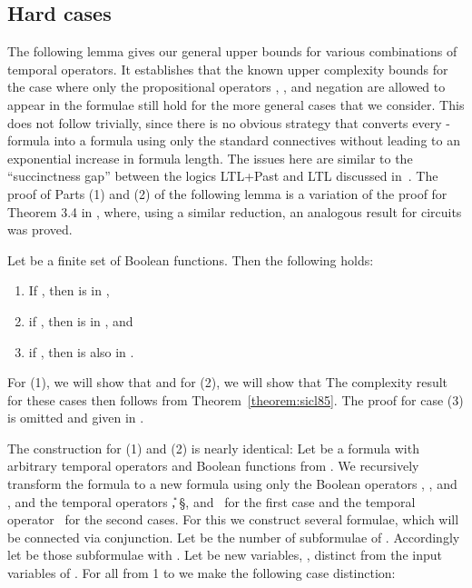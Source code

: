 \subsection{Hard cases}

  The following lemma gives our general upper bounds for various combinations of temporal operators.
It establishes that the known upper complexity bounds for the case
  where only the propositional operators \AND, \OR, and negation are
  allowed to appear in the formulae still hold for the more general
  cases that we consider. This does not follow trivially, since there
  is no obvious strategy that converts every -formula into a
  formula using only the standard connectives without leading to an
  exponential increase in formula length. The issues here are similar
  to the ``succinctness gap'' between the logics LTL+Past and LTL
  discussed in~\cite{mar04}. The proof of Parts (1) and (2) of the
  following lemma is a variation of the proof for Theorem 3.4 in
  \cite{bhss06}, where, using a similar reduction, an analogous result
  for circuits was proved.



  \begin{lemma}\label{lemma:PSPACE_ub_all}
  Let  be a finite set of Boolean functions. Then the following holds:
  \begin{enumerate}[\em(1)]
   \item If , then  is in \PSPACE,
   \item if , then  is in \NP, and
   \item if , then  is also in \NP.
  \end{enumerate}
  \end{lemma}

  \proof For (1), we will show that  and
    for (2), we will show that  The complexity result for these cases then follows from Theorem~\ref{theorem:sicl85}.
    \ifreport
    \else
      The proof for case (3) is omitted and given in \cite{bsssv06}.
    \fi

    The construction for (1) and (2) is nearly identical: Let  be a formula with arbitrary temporal operators and Boolean functions from .
    We recursively transform the formula to a new formula using only the Boolean operators , , and , and the temporal
    operators \U, \S, and \X\ for the first case
    and the temporal operator \F\ for the second case\ifreport s\fi.
    For this we construct several formulae, which will be connected via conjunction. Let  be the number of subformulae of .
Accordingly let  be those subformulae with . Let  be new
    variables, \ie, distinct from the input variables of . For all  from 1 to  we make the following case
    distinction:

